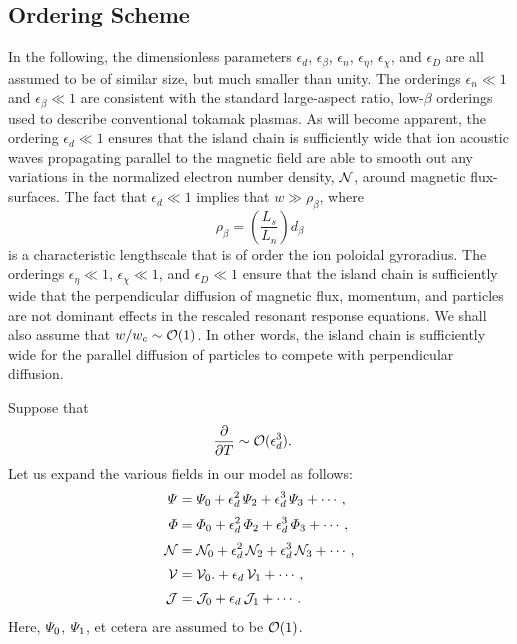 \documentclass[12pt,prb,aps]{revtex4-1}
\begin{document}
\subsection{Ordering Scheme}
In the following, the dimensionless parameters $\epsilon_d$, $\epsilon_\beta$, $\epsilon_n$, $\epsilon_\eta$, $\epsilon_\chi$,
and $\epsilon_D$ are all assumed to be of similar size, but much smaller than unity. The orderings $\epsilon_n\ll 1$ and $\epsilon_\beta\ll 1$
are consistent with the standard large-aspect ratio, low-$\beta$ orderings used to describe conventional tokamak
plasmas.\cite{rf1993} As will become apparent, the ordering $\epsilon_d\ll 1$ ensures that the island chain is
sufficiently wide that ion acoustic waves propagating parallel to the magnetic field are able to smooth out any
variations in the normalized electron number density, ${\cal N}$, around magnetic flux-surfaces.\cite{scott} The fact that $\epsilon_d\ll 1$ implies that
$w \gg \rho_\beta$,
where
\begin{equation}
\rho_\beta = \left(\frac{L_s}{L_n}\right)d_\beta
\end{equation}
is a characteristic lengthscale that is of order the ion poloidal gyroradius. 
 The orderings $\epsilon_\eta\ll 1$, $\epsilon_\chi\ll 1$, and $\epsilon_D\ll 1$ ensure that the island
chain is sufficiently wide that the perpendicular diffusion of magnetic flux, momentum, and particles are not dominant
effects in the rescaled resonant response equations. We shall also assume that $w/w_c\sim{\cal O}(1)$. In other words, the
island chain is sufficiently wide for the parallel diffusion of particles to compete with perpendicular diffusion.\cite{rff} 

Suppose that 
\begin{align}
\frac{\partial}{\partial T}&\sim {\cal O}(\epsilon_d^3).
\end{align}
Let us expand the various fields in our model as follows:
\begin{align}
{\mit\Psi}&= {\mit\Psi}_0+\epsilon_d^2\,{\mit\Psi}_2+ \epsilon_d^3\,{\mit\Psi}_3 + \cdots,\label{e429}\\[0.5ex]
{\mit\Phi}&= {\mit\Phi}_0+\epsilon_d^2\,{\mit\Phi}_2+ \epsilon_d^3\,{\mit\Phi}_3 + \cdots,\\[0.5ex]
{\cal N}&= {\cal N}_0+\epsilon_d^2\,{\cal N}_2+ \epsilon_d^3\,{\cal N}_3 + \cdots,\label{e431}\\[0.5ex]
{\cal V} & ={\cal V}_0. +\epsilon_d\,{\cal V}_1 +\cdots,\\[0.5ex]
{\cal J} &= {\cal J}_0 + \epsilon_d\,{\cal J}_1 +\cdots. \label{e496}
\end{align}
Here, ${\mit\Psi}_0$, ${\mit\Psi}_1$, et cetera are assumed to be ${\cal O}(1)$. 
\end{document}
